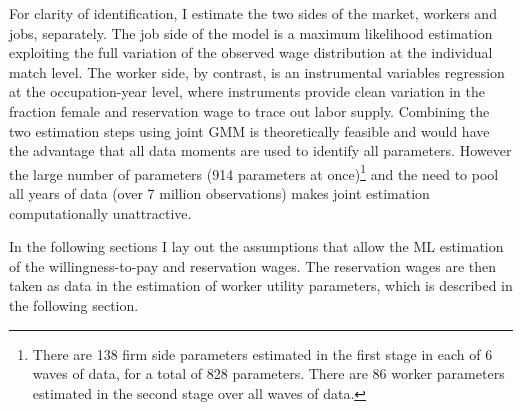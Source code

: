 \documentclass[11pt]{article}
\begin{document}
For clarity of identification, I estimate the two sides of the market, workers and jobs, separately. The job side of the model is a maximum likelihood estimation exploiting the full variation of the observed wage distribution at the individual match level. The worker side, by contrast, is an instrumental variables regression at the occupation-year level, where instruments provide clean variation in the fraction female and reservation wage to trace out labor supply. Combining the two estimation steps using joint GMM is theoretically feasible and would have the advantage that all data moments are used to identify all parameters. However the large number of parameters (914 parameters at once)\footnote{There are 138 firm side parameters estimated in the first stage in each of 6 waves of data, for a total of 828 parameters. There are 86 worker parameters estimated in the second stage over all waves of data.} and the need to pool all years of data (over 7 million observations) makes joint estimation computationally unattractive.


In the following sections I lay out the assumptions that allow the ML estimation of the willingness-to-pay and reservation wages. The reservation wages are then taken as data in the estimation of worker utility parameters, which is described in the following section.

\end{document}
